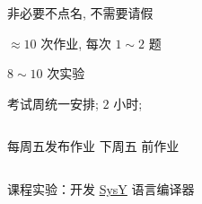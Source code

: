 \begin{frame}{}
  \begin{columns}
  \end{columns}
\end{frame}

\begin{frame}{}
  \begin{columns}
      \begin{description}[<+->]
        \setlength{\itemsep}{25pt}
        \item[\blue{\bf 考勤 ($00\%$):}] 非必要不点名, 不需要请假
        \item[\cyan{\bf 平时作业 ($00\%$):}] $\approx 10$ 次作业, 每次 $1 \sim 2$ 题
        \item[\red{\bf 课程实验 ($60\%$):}] $8 \sim 10$ 次实验
        \item[\red{\bf 期末测试 ($40\%$):}] 考试周统一安排; $2$ 小时; 
      \end{description}
  \end{columns}
\end{frame}

\begin{frame}{}
  \begin{center}
    每周五发布作业 \qquad 下周五  前作业
  \end{center}

  \begin{columns}
    \vspace{-0.80cm}
    \begin{center}
    \end{center}
  \end{columns}
\end{frame}

\begin{frame}{}
  \begin{center}
    课程实验：开发 \href{https://compiler.educg.net/}{\textsf{SysY}} 语言编译器


    \vspace{0.30cm}
  \end{center}
\end{frame}


